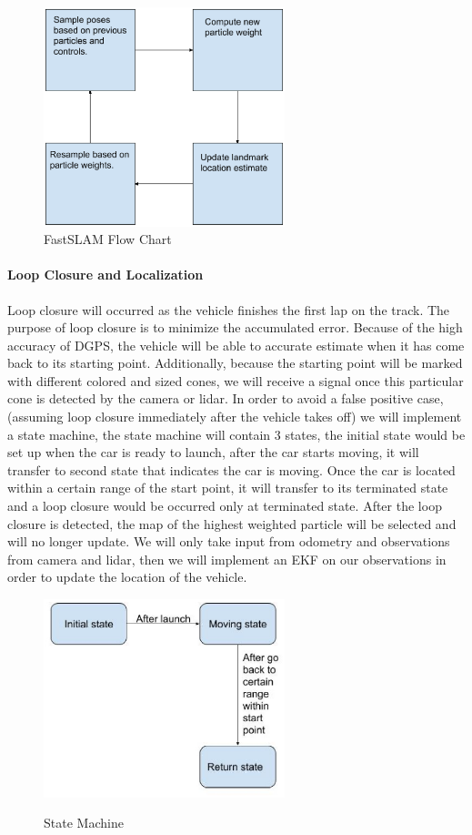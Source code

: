 \documentclass[10pt, onecolumn, draftclsnofoot, letterpaper,compsoc]{IEEEtran}
\begin{document}
\begin{figure}[H]
\label{fig:FastSLAM}
\centering
\caption{FastSLAM Flow Chart}
\includegraphics[width=7cm]{images/FastSLAMflow}
\end{figure}

\paragraph{Loop Closure and Localization}
Loop closure will occurred as the vehicle finishes the first lap on the track. The purpose of loop closure is to minimize the accumulated error. Because of the high accuracy of DGPS, the vehicle will be able to accurate estimate when it has come back to its starting point. Additionally, because the starting point will be marked with different colored and sized cones, we will receive a signal once this particular cone is detected by the camera or lidar. In order to avoid a false positive case, (assuming loop closure immediately after the vehicle takes off) we will implement a state machine, the state machine will contain 3 states, the initial state would be set up when the car is ready to launch, after the car starts moving, it will transfer to second state that indicates the car is moving. Once the car is located within a certain range of the start point, it will transfer to its terminated state and a loop closure would be occurred only at terminated state. After the loop closure is detected, the map of the highest weighted particle will be selected and will no longer update. We will only take input from odometry and observations from camera and lidar, then we will implement an EKF on our observations in order to update the location of the vehicle.
\begin{figure}[H]
    \centering
    \caption{State Machine}
    \includegraphics[width=7cm]{images/State_Machine}
    \label{fig:State_Machine}
\end{figure}
\end{document}
